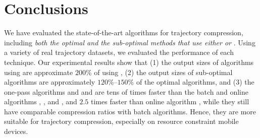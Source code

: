 \vspace{-1ex}
\section{Conclusions}

We have evaluated the state-of-the-art \lsa algorithms for trajectory compression, including \emph{both the optimal and the sub-optimal methods that use either \ped or \sed}. 
Using a variety of real trajectory datasets, we evaluated the performance of each technique. %
Our experimental results show that 
(1) the output sizes of algorithms using \sed are approximate $200\%$ of using \ped, 
(2) the output sizes of sub-optimal algorithms are approximately $120\%$--$150\%$ of the optimal algorithms, and 
(3) the one-pass algorithms \siped and \operb and \cised are tens of times faster than the batch and online algorithms \tpa, \dpa, and \bqsa, and $2.5$ times faster than online algorithm \squishe, while they still have comparable compression ratios with batch algorithms. Hence, they are more suitable for trajectory compression, especially on resource constraint mobile devices.